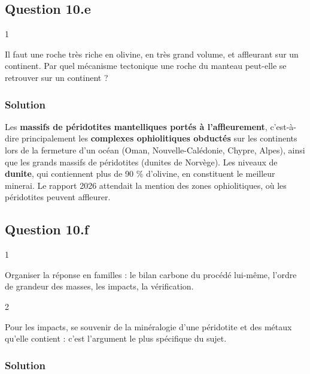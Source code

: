 \documentclass[11pt,a4paper]{article}
\begin{document}
\hypertarget{question-10.e}{%
\subsection{Question 10.e}\label{question-10.e}}

\begin{indication}{1}

Il faut une roche très riche en olivine, en très grand volume, et affleurant sur un continent. Par quel mécanisme tectonique une roche du manteau peut-elle se retrouver sur un continent ?

\end{indication}

\hypertarget{solution-34}{%
\subsubsection{Solution}\label{solution-34}}

Les \textbf{massifs de péridotites mantelliques portés à l'affleurement}, c'est-à-dire principalement les \textbf{complexes ophiolitiques obductés} sur les continents lors de la fermeture d'un océan (Oman, Nouvelle-Calédonie, Chypre, Alpes), ainsi que les grands massifs de péridotites (dunites de Norvège). Les niveaux de \textbf{dunite}, qui contiennent plus de 90 \% d'olivine, en constituent le meilleur minerai. Le rapport 2026 attendait la mention des zones ophiolitiques, où les péridotites peuvent affleurer.

\hypertarget{question-10.f}{%
\subsection{Question 10.f}\label{question-10.f}}

\begin{indication}{1}

Organiser la réponse en familles : le bilan carbone du procédé lui-même, l'ordre de grandeur des masses, les impacts, la vérification.

\end{indication}

\begin{indication}{2}

Pour les impacts, se souvenir de la minéralogie d'une péridotite et des métaux qu'elle contient : c'est l'argument le plus spécifique du sujet.

\end{indication}

\hypertarget{solution-35}{%
\subsubsection{Solution}\label{solution-35}}
\end{document}
